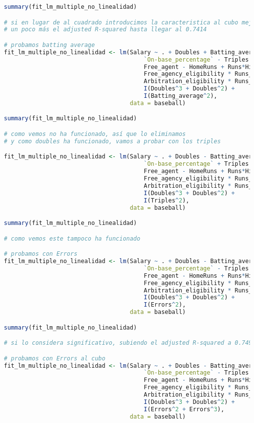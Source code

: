 \begin{lstlisting}[language=R]
summary(fit_lm_multiple_no_linealidad)

# si en lugar de al cuadrado introducimos la caracteristica al cubo mejoramos
# un poco más el adjusted R-squared hasta llegar al 0.7414

# probamos batting average
fit_lm_multiple_no_linealidad <- lm(Salary ~ . + Doubles + Batting_average - Walks -
										`On-base_percentage` - Triples - Arbitration - Errors -
										Free_agent - HomeRuns + Runs*Hits +
										Free_agency_eligibility * Runs_batted_in +
										Arbitration_eligibility * Runs_batted_in +
										I(Doubles^3 + Doubles^2) +
										I(Batting_average^2),
									data = baseball)

summary(fit_lm_multiple_no_linealidad)

# como vemos no ha funcionado, así que lo eliminamos
# y como doubles ha funcionado, vamos a probar con los triples

fit_lm_multiple_no_linealidad <- lm(Salary ~ . + Doubles - Batting_average - Walks -
										`On-base_percentage` + Triples - Arbitration - Errors -
										Free_agent - HomeRuns + Runs*Hits +
										Free_agency_eligibility * Runs_batted_in +
										Arbitration_eligibility * Runs_batted_in +
										I(Doubles^3 + Doubles^2) +
										I(Triples^2),
									data = baseball)

summary(fit_lm_multiple_no_linealidad)

# como vemos este tampoco ha funcionado

# probamos con Errors
fit_lm_multiple_no_linealidad <- lm(Salary ~ . + Doubles - Batting_average - Walks -
										`On-base_percentage` - Triples - Arbitration + Errors -
										Free_agent - HomeRuns + Runs*Hits +
										Free_agency_eligibility * Runs_batted_in +
										Arbitration_eligibility * Runs_batted_in +
										I(Doubles^3 + Doubles^2) +
										I(Errors^2),
									data = baseball)

summary(fit_lm_multiple_no_linealidad)

# si lo considera significativo, subiendo el adjusted R-squared a 0.7499

# probamos con Errors al cubo
fit_lm_multiple_no_linealidad <- lm(Salary ~ . + Doubles - Batting_average - Walks -
										`On-base_percentage` - Triples - Arbitration + Errors -
										Free_agent - HomeRuns + Runs*Hits +
										Free_agency_eligibility * Runs_batted_in +
										Arbitration_eligibility * Runs_batted_in +
										I(Doubles^3 + Doubles^2) +
										I(Errors^2 + Errors^3),
									data = baseball)


\end{lstlisting}
